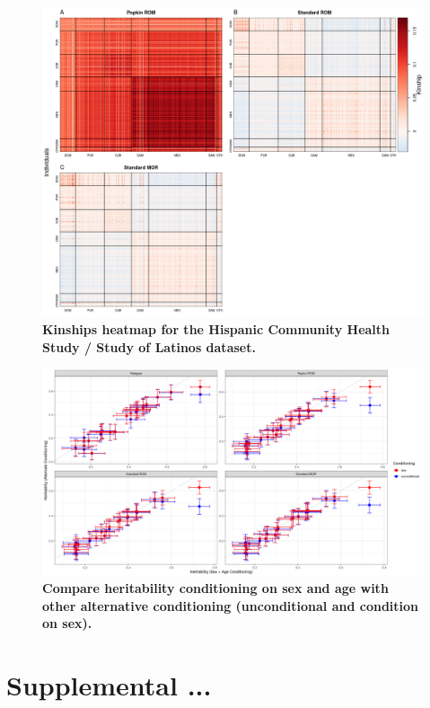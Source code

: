 \documentclass[11pt]{article}
\begin{document}
\begin{figure}[bp!]
  \centering
  \includegraphics[width=\textwidth]{data/SFig_HCHS_All_maf001_kinships.png}
  \caption{
    {\bf Kinships heatmap for the Hispanic Community Health Study / Study of Latinos dataset.}
    }
  \label{fig:HCHS_kinships}
\end{figure}



\begin{figure}[bp!]
  \centering
  \includegraphics[width=\textwidth]{data/SFig_T2D_condition_compare.png}
  \caption{
    {\bf Compare heritability conditioning on sex and age with other alternative conditioning (unconditional and condition on sex).}
    }
  \label{fig:condition_compare}
\end{figure}



\section{Supplemental ...}
\end{document}
